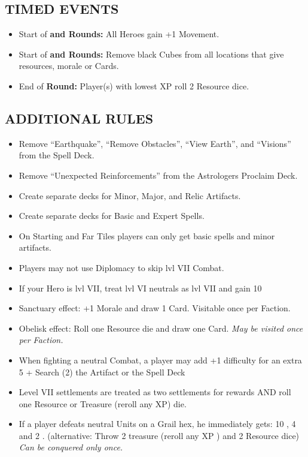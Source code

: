 \begin{multicols*}{2}
\subsection*{\MakeUppercase{Timed Events}}

\begin{itemize}
  \item Start of \textbf{ and  Rounds:} All Heroes gain +1 Movement.
  \item Start of \textbf{ and  Rounds:} Remove black Cubes from all locations that give resources, morale or Cards.
  \item End of \textbf{ Round:} Player(s) with lowest XP roll 2 Resource dice.
\end{itemize}

\subsection*{\MakeUppercase{Additional Rules}}
\begin{itemize}
  \item Remove ``Earthquake'', ``Remove Obstacles'', ``View Earth'', and ``Visions'' from the Spell Deck.
  \item Remove ``Unexpected Reinforcements'' from the Astrologers Proclaim Deck.
  \item Create separate decks for Minor, Major, and Relic Artifacts.
  \item Create separate decks for Basic and Expert Spells.
  \item On Starting and Far Tiles players can only get basic spells and minor artifacts.
  \item Players may not use Diplomacy to skip lvl VII Combat.
  \item If your Hero is lvl VII, treat lvl VI neutrals as lvl VII and gain 10 
  \item Sanctuary effect: +1 Morale and draw 1 Card. Visitable once per Faction.
  \item Obelisk effect: Roll one Resource die and draw one Card. \textit{May be visited once per Faction.}
  \item When fighting a neutral Combat, a player may add +1 difficulty for an extra 5  + Search (2) the Artifact or the Spell Deck
  \item Level VII settlements are treated as two settlements for rewards AND roll one Resource or Treasure (reroll any XP) die.
  \item If a player defeats neutral Units on a Grail hex, he immediately gets: 10 , 4  and 2 . (alternative: Throw 2 treasure (reroll any XP ) and 2 Resource dice)  \textit{Can be conquered only once.}

\end{itemize}
\end{multicols*}

